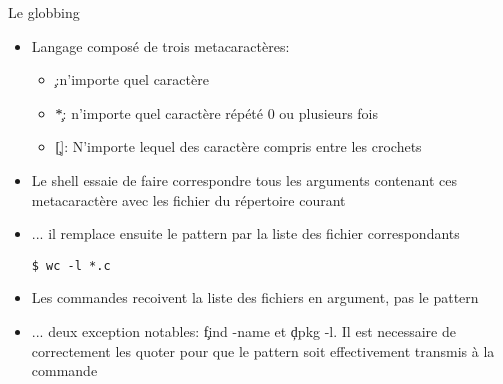 \begin{frame}[fragile=singleslide]{Le globbing}
  \begin{itemize}
  \item Langage composé de trois metacaractères:
    \begin{itemize}
    \item \c{\?}:n'importe quel caractère
    \item \c{*}: n'importe quel caractère répété 0 ou plusieurs fois
    \item \c{[]}: N'importe lequel des caractère compris entre les crochets
    \end{itemize}
  \item Le shell essaie de faire correspondre tous les arguments
    contenant ces metacaractère avec les fichier du répertoire courant
  \item ... il remplace ensuite le pattern par la liste des fichier correspondants
    \begin{lstlisting}
$ wc -l *.c
    \end{lstlisting}
  \item Les commandes recoivent la liste des fichiers en argument, pas le pattern
  \item ... deux exception notables: \c{find -name} et \c{dpkg -l}. Il
    est necessaire de correctement les quoter pour que le pattern soit
    effectivement transmis à la commande
  \end{itemize}
\end{frame}

